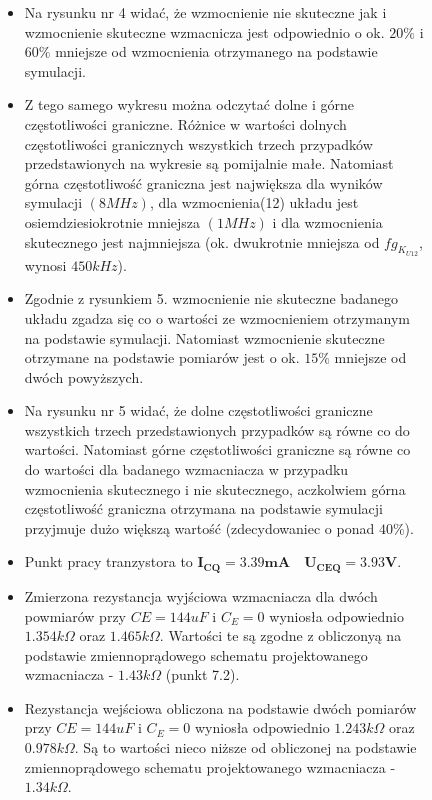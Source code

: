 \documentclass[a4paper,12pt]{article}
\begin{document}
\begin{figure}
\begin{itemize}
  \item Na rysunku nr 4 widać, że wzmocnienie nie skuteczne jak i wzmocnienie skuteczne wzmacnicza
	jest odpowiednio o ok. $20\%$ i $60\%$ mniejsze od wzmocnienia
	otrzymanego na podstawie symulacji.
  \item Z tego samego wykresu można odczytać dolne i górne częstotliwości graniczne. 
	Różnice w wartości dolnych częstotliwości granicznych wszystkich trzech przypadków 
	przedstawionych na wykresie są pomijalnie małe. Natomiast górna częstotliwość graniczna 
	jest największa dla wyników symulacji $(8MHz)$, dla wzmocnienia(12) układu
	jest osiemdziesiokrotnie mniejsza $(1MHz)$ i dla wzmocnienia skutecznego jest najmniejsza
	(ok. dwukrotnie mniejsza od $fg_{K_{U12}}$, wynosi $450kHz$).
  \item Zgodnie z rysunkiem 5. wzmocnienie nie skuteczne badanego układu zgadza się co o wartości
	ze wzmocnieniem otrzymanym na podstawie symulacji. Natomiast wzmocnienie skuteczne 
	otrzymane na podstawie pomiarów jest o ok. $15\%$ mniejsze od dwóch powyższych.

\end{itemize}
\end{figure}
\pagebreak

\begin{figure}
 \begin{itemize}
    \item Na rysunku nr 5 widać, że dolne częstotliwości graniczne wszystkich trzech przedstawionych
	przypadków są równe co do wartości. Natomiast górne częstotliwości graniczne są równe co do 
	wartości dla badanego wzmacniacza w przypadku wzmocnienia skutecznego i nie skutecznego,
	aczkolwiem górna częstotliwość graniczna otrzymana na podstawie symulacji przyjmuje
	dużo większą wartość (zdecydowaniec o ponad $40\%$).
  \item Punkt pracy tranzystora to $\mathbf{I_{CQ} = 3.39mA \quad U_{CEQ} = 3.93V}$.
  \item Zmierzona rezystancja wyjściowa wzmacniacza dla dwóch powmiarów przy $CE=144uF$
	i $C_E=0$ wyniosła odpowiednio $1.354k\Omega$ oraz $1.465k\Omega$. Wartości te są zgodne
	z obliczonyą na podstawie zmiennoprądowego schematu projektowanego wzmacniacza - $1.43k\Omega$
	(punkt 7.2).
  \item Rezystancja wejściowa obliczona na podstawie dwóch pomiarów przy $CE=144uF$
	i $C_E=0$ wyniosła odpowiednio $1.243k\Omega$ oraz $0.978k\Omega$. Są to wartości nieco niższe
	od obliczonej na podstawie zmiennoprądowego schematu projektowanego wzmacniacza - $1.34k\Omega$.
 \end{itemize}

\end{figure}
\end{document}
